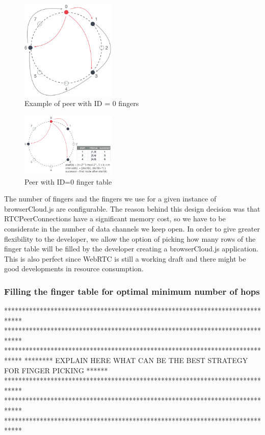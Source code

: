 \begin{figure}[h!]
  \centering
  \includegraphics[width=0.4\textwidth]{figs/chord-5}
  \caption{Example of peer with ID = 0 fingers}
  \label{fig:c-5}
\end{figure}

\begin{figure}[h!]
  \centering
  \includegraphics[width=0.4\textwidth]{figs/chord-6}
  \caption{Peer with ID=0 finger table}
  \label{fig:c-6}
\end{figure}

The number of fingers and the fingers we use for a given instance of browserCloud.js are configurable. The reason behind this design decision was that RTCPeerConnections have a significant memory cost, so we have to be considerate in the number of data channels we keep open. In order to give greater flexibility to the developer, we allow the option of picking how many rows of the finger table will be filled by the developer creating a browserCloud.js application. This is also perfect since WebRTC is still a working draft and there might be good developments in resource consumption.

\subsubsection{Filling the finger table for optimal minimum number of hops}

*****************************************************************************
*****************************************************************************
*****************************************************************************
******** EXPLAIN HERE WHAT CAN BE THE BEST STRATEGY FOR FINGER PICKING ******
*****************************************************************************
*****************************************************************************
*****************************************************************************


